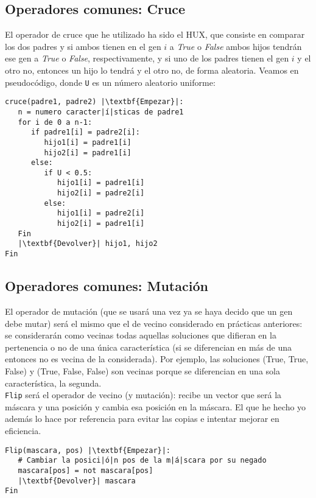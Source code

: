 \documentclass[12pt]{article}
\begin{document}
\subsection{Operadores comunes: Cruce}
El operador de cruce que he utilizado ha sido el HUX, que consiste en comparar los dos padres y si ambos tienen en el gen $i$ a \textit{True} o \textit{False} ambos hijos tendrán ese gen a \textit{True} o \textit{False}, respectivamente, y si uno de los padres tienen el gen $i$ y el otro no, entonces un hijo lo tendrá y el otro no, de forma aleatoria. Veamos en pseudocódigo, donde \texttt{U} es un número aleatorio uniforme:
\begin{lstlisting}
cruce(padre1, padre2) |\textbf{Empezar}|:
   n = numero caracter|í|sticas de padre1
   for i de 0 a n-1:
      if padre1[i] = padre2[i]:
         hijo1[i] = padre1[i]
         hijo2[i] = padre1[i]
      else:
         if U < 0.5:
            hijo1[i] = padre1[i]
            hijo2[i] = padre2[i]
         else:
            hijo1[i] = padre2[i]
            hijo2[i] = padre1[i]
   Fin
   |\textbf{Devolver}| hijo1, hijo2
Fin
\end{lstlisting}

\subsection{Operadores comunes: Mutación}
El operador de mutación (que se usará una vez ya se haya decido que un gen debe mutar) será el mismo que el de vecino considerado en prácticas anteriores: se considerarán como vecinas todas aquellas soluciones que difieran en la pertenencia o no de una única característica (si se diferencian en más de una entonces no es vecina de la considerada). Por ejemplo, las soluciones (True, True, False) y (True, False, False) son vecinas porque se diferencian en una sola característica, la segunda.\\
\texttt{Flip} será el operador de vecino (y mutación): recibe un vector que será la máscara y una posición y cambia esa posición en la máscara. El que he hecho yo además lo hace por referencia para evitar las copias e intentar mejorar en eficiencia.\\

\begin{lstlisting}
Flip(mascara, pos) |\textbf{Empezar}|:
   # Cambiar la posici|ó|n pos de la m|á|scara por su negado 
   mascara[pos] = not mascara[pos]
   |\textbf{Devolver}| mascara
Fin
\end{lstlisting}
\end{document}

